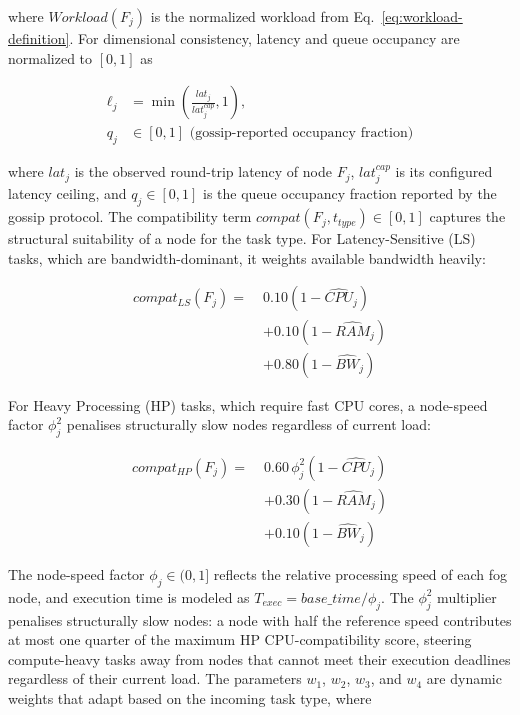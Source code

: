 \documentclass[conference]{IEEEtran}
\begin{document}
    where $Workload(F_j)$ is the normalized workload from Eq.~\eqref{eq:workload-definition}. For dimensional consistency, latency and queue occupancy are normalized to $[0,1]$ as

    \begin{equation}
    \begin{aligned}
    \ell_j &= \min\!\left(\frac{lat_j}{lat_j^{cap}},1\right),\\
    q_j &\in [0,1] \text{ (gossip-reported occupancy fraction)}
    \end{aligned}
    \label{eq:e5-normalized-latency-queue}
    \end{equation}

    where $lat_j$ is the observed round-trip latency of node $F_j$, $lat_j^{cap}$ is its configured latency ceiling, and $q_j \in [0,1]$ is the queue occupancy fraction reported by the gossip protocol. The compatibility term $compat(F_j,t_{type})\in[0,1]$ captures the structural suitability of a node for the task type. For Latency-Sensitive (LS) tasks, which are bandwidth-dominant, it weights available bandwidth heavily:

    \begin{equation}
    \begin{aligned}
    compat_{LS}(F_j) =\;& 0.10(1-\widehat{CPU}_j) \\
    &+ 0.10(1-\widehat{RAM}_j) \\
    &+ 0.80(1-\widehat{BW}_j)
    \end{aligned}
    \end{equation}

    For Heavy Processing (HP) tasks, which require fast CPU cores, a node-speed factor $\phi_j^2$ penalises structurally slow nodes regardless of current load:

    \begin{equation}
    \begin{aligned}
    compat_{HP}(F_j) =\;& 0.60\,\phi_j^2(1-\widehat{CPU}_j)\\
    &+ 0.30(1-\widehat{RAM}_j) \\
    &+ 0.10(1-\widehat{BW}_j)
    \end{aligned}
    \end{equation}

    The node-speed factor $\phi_j \in (0,1]$ reflects the relative processing speed of each fog node, and execution time is modeled as $T_{exec}=base\_time/\phi_j$. The $\phi_j^2$ multiplier penalises structurally slow nodes: a node with half the reference speed contributes at most one quarter of the maximum HP CPU-compatibility score, steering compute-heavy tasks away from nodes that cannot meet their execution deadlines regardless of their current load.
    The parameters $w_1$, $w_2$, $w_3$, and $w_4$ are dynamic weights that adapt based on the incoming task type, where
\end{document}
